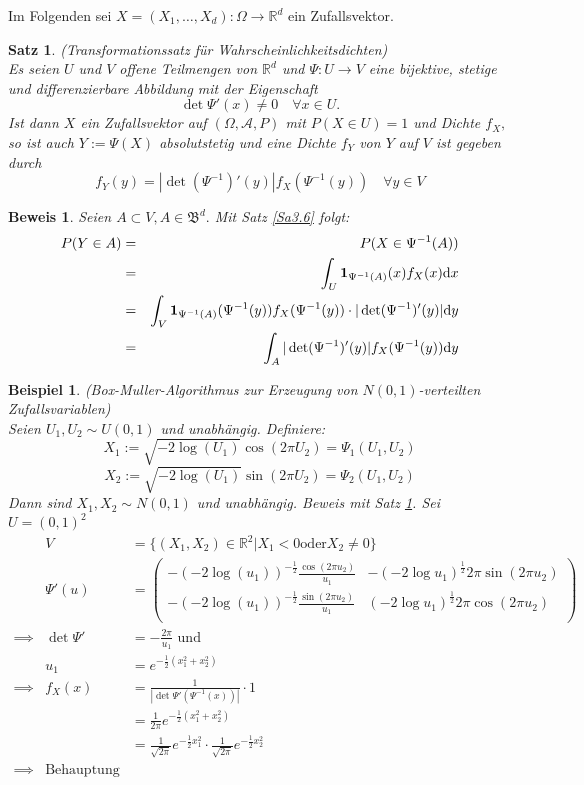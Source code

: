 \documentclass[a4paper,11pt]{book}
\newcommand{\R}{{\mathbb R}}
\newcommand{\ind}{\text{\bf{1}}}
\def\AA{ \mathcal{A} }
\def\BB{ \mathfrak{B} }
\def\folgt{\ensuremath{\implies}}
\def\d{\mbox{d}}
\newtheorem{Sa}{Satz}[chapter]
\newtheorem{Bsp}{Beispiel}[chapter]
\theoremstyle{nonumberplain}
\newtheorem{Bew}{Beweis}
\begin{document}

Im Folgenden sei $X=(X_1, \ldots, X_d):\Omega\to\R^d$ ein Zufallsvektor.

\begin{Sa} (Transformationssatz für Wahrscheinlichkeitsdichten)\label{Sa3.7}\\
Es seien $U$ und $V$ offene Teilmengen von $\R^d$ und $\Psi:U\to V$ eine bijektive, stetige und differenzierbare Abbildung mit der Eigenschaft
$$\det\Psi'(x)\ne 0\quad\forall x\in U.$$
Ist dann $X$ ein Zufallsvektor auf $(\Omega, \AA, P)$ mit $P(X\in U)=1$ und Dichte $f_X,$ so ist auch $Y:=\Psi(X)$ absolutstetig und eine Dichte $f_Y$ von $Y$ auf $V$ ist gegeben durch
$$f_Y(y)=|\det(\Psi^{-1})'(y)|f_X(\Psi^{-1}(y))\quad \forall y\in V$$
\end{Sa}
\begin{Bew} Seien $A\subset V, A\in\BB^d.$ Mit Satz \ref{Sa3.6} folgt:
\begin{eqnarray*}
P(Y\in A) &=& P(X\in\Psi^{-1}(A))\\
&=& \int_U \ind_{\Psi^{-1}(A)}(x)f_X(x)\d x\\
&=& \int_V \ind_{\Psi^{-1}(A)}(\Psi^{-1}(y))f_X(\Psi^{-1}(y))\cdot|\det(\Psi^{-1})'(y)|\d y\\
&=& \int_A |\det(\Psi^{-1})'(y)|f_X(\Psi^{-1}(y))\d y\\
\end{eqnarray*}
\end{Bew}

\begin{Bsp} (Box-Muller-Algorithmus zur Erzeugung von $N(0,1)$-verteilten Zufallsvariablen) \label{Bsp3.3}\\
Seien $U_1, U_2 \sim U(0,1)$ und unabhängig. Definiere:
$$X_1:=\sqrt{-2\log(U_1)}\cos(2\pi U_2)=\Psi_1(U_1,U_2)$$
$$X_2:=\sqrt{-2\log(U_1)}\sin(2\pi U_2)=\Psi_2(U_1,U_2)$$
Dann sind $X_1, X_2\sim N(0,1)$ und unabhängig. Beweis mit Satz \ref{Sa3.7}. Sei $U=(0,1)^2$
\begin{eqnarray*}
&V&=\{(X_1,X_2)\in\R^2|X_1 < 0 \text{oder} X_2\ne 0\}\\
&\Psi'(u)&=\left(
\begin{array}{*{2}{c}}
-(-2\log(u_1))^{-\frac 1 2}\frac{\cos(2\pi u_2)}{u_1} & -(-2\log u_1)^{\frac 1 2} 2\pi\sin(2\pi u_2)\\
-(-2\log(u_1))^{-\frac 1 2}\frac{\sin(2\pi u_2)}{u_1} & (-2\log u_1)^{\frac 1 2} 2\pi\cos(2\pi u_2)\\
\end{array}
\right)\\
\folgt & \det\Psi'&=-\frac{2\pi}{u_1} \text{ und }\\
& u_1&=e^{-\frac 1 2 (x_1^2 + x_2^2)}\\
\folgt & f_X(x) &= \frac{1}{|\det\Psi'(\Psi^{-1}(x))|}\cdot 1\\
& &=\frac{1}{2\pi} e^{-\frac 1 2 (x_1^2 + x_2^2)}\\
& &=\frac{1}{\sqrt{2\pi}}e^{-\frac 1 2 x_1^2}\cdot \frac{1}{\sqrt{2\pi}}e^{-\frac 1 2 x_2^2}\\
\folgt & \text{Behauptung}
\end{eqnarray*}
\end{Bsp}
\end{document}
